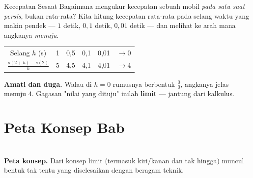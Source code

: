 \documentclass[11pt,a4paper]{report}
\theoremstyle{gaya}
\begin{document}
\begin{studikasus}{Kecepatan Sesaat}
Bagaimana mengukur kecepatan sebuah mobil \emph{pada satu saat persis}, bukan rata-rata? Kita hitung kecepatan rata-rata pada selang waktu yang makin pendek --- $1$ detik, $0{,}1$ detik, $0{,}01$ detik --- dan melihat ke arah mana angkanya \emph{menuju}.
\begin{center}
\begin{tabular}{c|ccccc}
\toprule
Selang $h$ (s) & 1 & 0{,}5 & 0{,}1 & 0{,}01 & $\to0$ \\
$\frac{s(2+h)-s(2)}{h}$ & 5 & 4{,}5 & 4{,}1 & 4{,}01 & $\to4$ \\
\bottomrule
\end{tabular}
\end{center}
\textbf{Amati dan duga.} Walau di $h=0$ rumusnya berbentuk $\tfrac00$, angkanya jelas menuju $4$. Gagasan "nilai yang dituju" inilah \textbf{limit} --- jantung dari kalkulus.
\end{studikasus}

\section*{Peta Konsep Bab}
\begin{center}
\\
\small \textbf{Peta konsep.} Dari konsep limit (termasuk kiri/kanan dan tak hingga) muncul bentuk tak tentu yang diselesaikan dengan beragam teknik.
\end{center}
\end{document}
